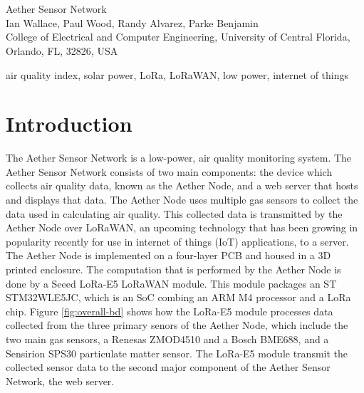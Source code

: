 \documentclass[conference]{IEEEtran}
\newcommand*{\lorawan}{LoRaWAN\xspace}
\begin{document}
\section*{}
\begin{center}
{\huge Aether Sensor Network} \\ \vspace{2 em}
{\Large Ian Wallace, Paul Wood, Randy Alvarez, Parke Benjamin} \\ \vspace{2em}
{\Large College of Electrical and Computer Engineering, University of Central Florida, Orlando, FL, 32826, USA} \\ \vspace{3em}
\end{center}


\begin{abstract}
Poor or even hazardous air quality can pose a health risk to those with respiratory conditions or those in vulnerable age groups, such as the elderly and young children. Therefore the ability to monitor the local air quality is vital. In this paper, we present our design for a low power, air quality monitoring system called Aether. Aether uses gas and particulate matter sensors to collect the data used in calculating air quality. This data is sent over a LoRaWAN network to a server where the air quality index is computed. The data is then displayed on a web page for viewing by the user. This includes the ability to see the different data overlaid
\end{abstract}

\begin{IEEEkeywords}
air quality index, solar power, LoRa, LoRaWAN, low power, internet of things
\end{IEEEkeywords}

\section{Introduction}
The Aether Sensor Network is a low-power, air quality monitoring system. The Aether Sensor Network consists of two main components: the device which collects air quality data, known as the Aether Node, and a web server that hosts and displays that data. The Aether Node uses multiple gas sensors to collect the data used in calculating air quality. This collected data is transmitted by the Aether Node over \lorawan, an upcoming technology that has been growing in popularity recently for use in internet of things (IoT) applications, to a server. The Aether Node is implemented on a four-layer PCB and housed in a 3D printed enclosure. The computation that is performed by the Aether Node is done by a Seeed LoRa-E5 LoRaWAN module. This module packages an ST STM32WLE5JC, which is an SoC combing an ARM M4 processor and a LoRa chip. Figure \ref{fig:overall-bd} shows how the LoRa-E5 module processes data collected from the three primary senors of the Aether Node, which include the two main gas sensors, a Renesas ZMOD4510 and a Bosch BME688, and a Sensirion SPS30 particulate matter sensor. The LoRa-E5 module transmit the collected sensor data to the second major component of the Aether Sensor Network, the web server. 
\end{document}
